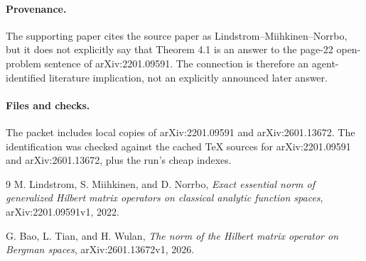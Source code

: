 \documentclass[11pt]{article}
\begin{document}
\paragraph{Provenance.}
The supporting paper cites the source paper as Lindstrom--Miihkinen--Norrbo,
but it does not explicitly say that Theorem 4.1 is an answer to the page-22
open-problem sentence of arXiv:2201.09591. The connection is therefore an
agent-identified literature implication, not an explicitly announced later
answer.

\paragraph{Files and checks.}
The packet includes local copies of arXiv:2201.09591 and arXiv:2601.13672.
The identification was checked against the cached TeX sources for
arXiv:2201.09591 and arXiv:2601.13672, plus the run's cheap indexes.

\begin{thebibliography}{9}
M. Lindstrom, S. Miihkinen, and D. Norrbo,
\emph{Exact essential norm of generalized Hilbert matrix operators on
classical analytic function spaces}, arXiv:2201.09591v1, 2022.

G. Bao, L. Tian, and H. Wulan,
\emph{The norm of the Hilbert matrix operator on Bergman spaces},
arXiv:2601.13672v1, 2026.
\end{thebibliography}
\end{document}
